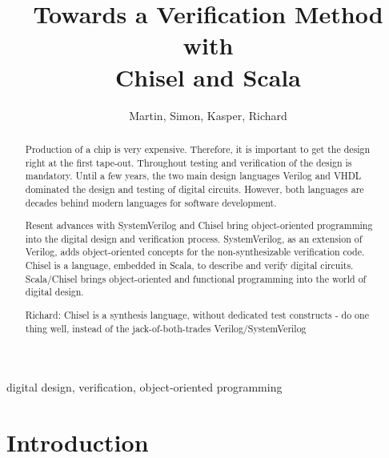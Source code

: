 \documentclass[a4paper, conference]{IEEEtran}
\newcommand{\ducky}[1]{{\color{orange} Richard: #1}}
\begin{document}

\title{Towards a Verification Method with\\
Chisel and Scala}

\author{Martin, Simon, Kasper, Richard}




\maketitle \thispagestyle{empty}

\begin{abstract}
Production of a chip is very expensive. Therefore, it is important to get the design right
at the first tape-out. Throughout testing and verification of the design is mandatory.
Until a few years, the two main design languages Verilog and VHDL dominated the
design and testing of digital circuits. However, both languages are decades behind
modern languages for software development.

Resent advances with SystemVerilog and Chisel bring object-oriented programming
into the digital design and verification process. SystemVerilog, as an extension of Verilog,
adds object-oriented concepts for the non-synthesizable verification code.
Chisel is a language, embedded in Scala, to describe and verify digital circuits.
Scala/Chisel brings object-oriented and functional programming into the world of
digital design.

\ducky{Chisel is a synthesis language, without dedicated test constructs - do one thing well, instead of the jack-of-both-trades Verilog/SystemVerilog}
\end{abstract}

\begin{IEEEkeywords}
digital design, verification, object-oriented programming
\end{IEEEkeywords}


\section{Introduction}
\label{sec:intro}
\end{document}
